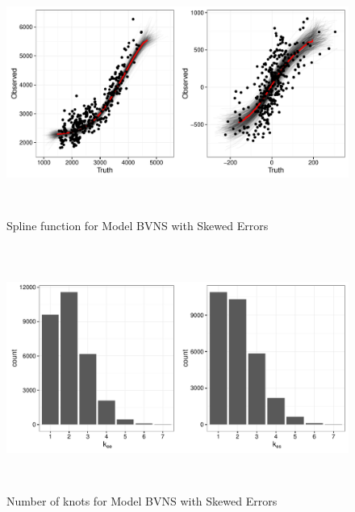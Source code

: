 \documentclass[11pt]{article}\usepackage[]{graphicx}\usepackage[]{color}
\begin{document}

  \begin{figure}
  \centering
  \includegraphics[width=17cm,height=8cm]{manual_figure/predbvnsx.pdf}
  \caption{Spline function for Model BVNS with Skewed Errors}
  \label{predbvnsx}
  \end{figure}
  
    \begin{figure}
  \centering
  \includegraphics[width=17cm,height=8cm]{manual_figure/khist.pdf}
  \caption{Number of knots for Model BVNS with Skewed Errors}
  \label{knots}
  \end{figure}

\end{document}
